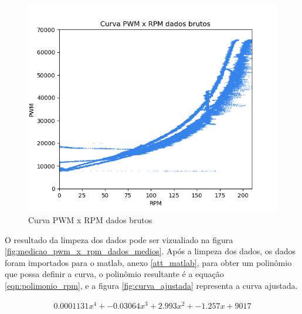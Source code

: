\begin{figure}[htb]
	\centering
	\includegraphics{figures/curva_pwm_x_rpm_dados_brutos}
	\caption{Curva PWM x RPM dados brutos}
	\label{fig:medicao_pwm_x_rpm_dados_brutos}
\end{figure}


O resultado da limpeza dos dados pode ser vizualiado na figura \ref{fig:medicao_pwm_x_rpm_dados_medios}.
Após a limpeza dos dados, os dados foram importados para o matlab, anexo \ref{att_matlab},
para obter um polinômio que possa definir a curva, o polinômio resultante é a equação \ref{eqn:polimonio_rpm}, e a figura \ref{fig:curva_ajustada} representa a curva ajustada.

\begin{equation}
    \begin{split}
        0.0001131x^{4} + -0.03064x^{3} + 2.993x^{2} + -1.257x + 9017
    \end{split}
    \label{eqn:polimonio_rpm}
\end{equation}

